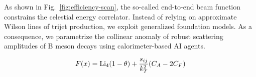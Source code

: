 As shown in Fig.~\ref{fig:efficiency-scan}, the so-called end-to-end
beam function constrains the celestial energy correlator. Instead of
relying on approximate Wilson lines of trijet production, we exploit
generalized foundation models. As a consequence, we parametrize the
collinear anomaly of robust scattering amplitudes of B meson decays
using calorimeter-based AI agents.

\begin{equation}
  F(x) = \mathrm{Li}_{4}(1 - \theta) + \frac{s_{ij}}{k_T^2} (C_A - 2C_F)
  \label{eq:1}
\end{equation}

